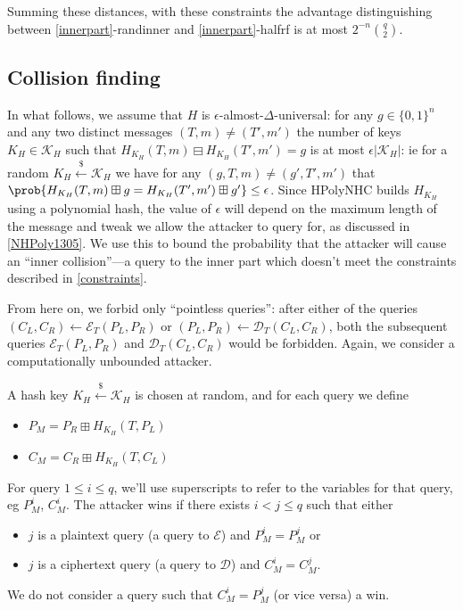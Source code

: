 \documentclass[journal=tosc,preprint,floatrow,submission]{iacrtrans}
\newcommand*{\xprm}[2]{\textsf{\ref*{#1}-#2}}
\newcommand*{\calE}{\mathcal{E}}
\newcommand*{\calD}{\mathcal{D}}
\begin{document}
Summing these distances, with these constraints the advantage distinguishing between
\xprm{innerpart}{randinner} and \xprm{innerpart}{halfrf} is at most
$2^{-n}\binom{q}{2}$.

\subsection{Collision finding}\label{collision}
In what follows, we assume that $H$ is $\epsilon$-almost-$\Delta$-universal:
for any $g \in \{0,1\}^n$ and
any two distinct messages $(T, m) \neq (T', m')$
the number of keys $K_H \in \mathcal{K}_H$
such that $H_{K_H}(T, m) \boxminus H_{K_H}(T', m') = g$ is at most $\epsilon|\mathcal{K}_H|$: ie
for a random
$K_H \xleftarrow{\$} \mathcal{K}_H$ we have for any $(g, T, m) \neq (g', T', m')$ that
$\prob{H_{K_H}(T, m) \boxplus g = H_{K_H}(T', m') \boxplus g'} \leq \epsilon$.
Since HPolyNHC builds $H_{K_H}$ using a polynomial hash, the value of $\epsilon$ will depend
on the maximum length of the message and tweak we allow the attacker to query for, as
discussed in \autoref{NHPoly1305}.
We use this to bound the probability that the attacker will cause an
``inner collision''---a query to the inner part which doesn't meet the constraints described
in \autoref{constraints}.

From here on, we forbid only ``pointless queries'': after either of the queries
$(C_L, C_R) \leftarrow \calE_T(P_L, P_R)$ or $(P_L, P_R) \leftarrow \calD_T(C_L, C_R)$,
both the subsequent queries
$\calE_T(P_L, P_R)$ and $\calD_T(C_L, C_R)$ would be forbidden. Again, we consider a
computationally unbounded attacker.

A hash key $K_H \xleftarrow{\$} \mathcal{K}_H$ is chosen at random, and for each query we define
\begin{itemize}
    \item $P_M = P_R \boxplus H_{K_H}(T, P_L)$
    \item $C_M = C_R \boxplus H_{K_H}(T, C_L)$
\end{itemize}

For query $1 \leq i \leq q$, we'll use superscripts to refer to the variables for that query, eg
$P_M^i$, $C_M^i$. The attacker wins if there exists $i < j \leq q$ such that
either
\begin{itemize}
    \item $j$ is a plaintext query (a query to $\calE$) and $P_M^i = P_M^j$ or
    \item $j$ is a ciphertext query (a query to $\calD$) and $C_M^i = C_M^j$.
\end{itemize}
We do not consider a query such that $C_M^i = P_M^j$ (or vice versa) a win.
\end{document}
